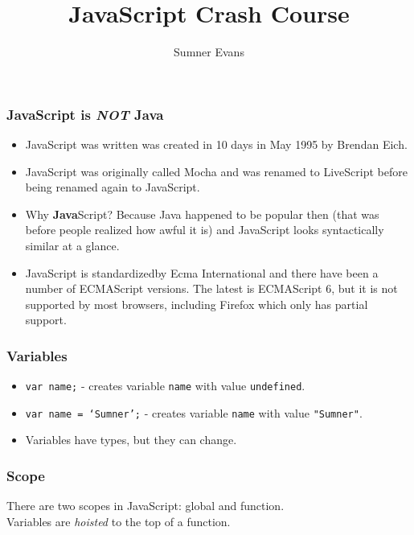 \documentclass{lug}
\title{JavaScript Crash Course}
\author{Sumner Evans}
\begin{document}
\begin{frame}
    \frametitle{JavaScript is \textbf{\textit{NOT}} Java \footnotemark[1]}

    \begin{itemize}[<+->]
        \item JavaScript was written was created in 10 days in May 1995 by Brendan Eich.
        \item JavaScript was originally called Mocha and was renamed to LiveScript before being
            renamed again to JavaScript.
        \item Why \textbf{Java}Script? Because Java happened to be popular then (that was before
            people realized how awful it is) and JavaScript looks syntactically similar at a glance.
        \item JavaScript is standardized\footnotemark[2] by Ecma International and there have been a
            number of ECMAScript versions. The latest is ECMAScript 6, but it is not supported by
            most browsers, including Firefox which only has partial support.
    \end{itemize}

\end{frame}

\begin{frame}
    \frametitle{Variables}

    \begin{itemize}
        \item \texttt{var name;} - creates variable \texttt{name} with value \texttt{undefined}.
        \item \texttt{var name = `Sumner';} - creates variable \texttt{name} with value
            \texttt{"Sumner"}.
        \item Variables have types, but they can change.
    \end{itemize}

%
\end{frame}

\begin{frame}
    \frametitle{Scope}

    There are two scopes in JavaScript: global and function.\footnotemark[1]\\

    Variables are \textit{hoisted} to the top of a function.

\end{frame}
\end{document}
